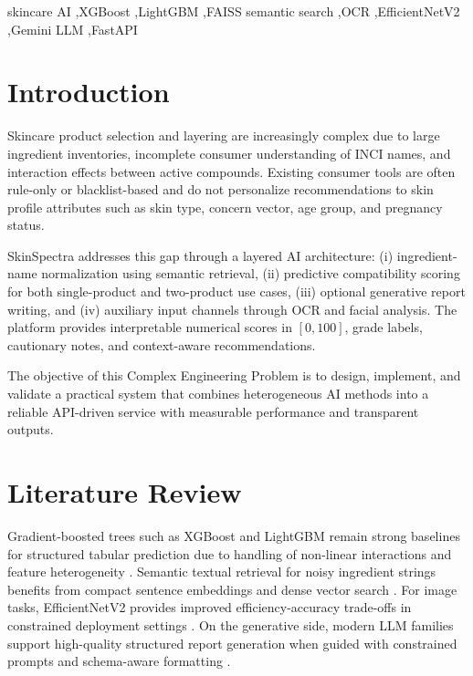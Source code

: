 \documentclass[a4paper,fleqn]{cas-sc}
\begin{document}
\begin{keywords}
 skincare AI \sep XGBoost \sep LightGBM \sep FAISS semantic search \sep OCR \sep EfficientNetV2 \sep Gemini LLM \sep FastAPI
\end{keywords}

\maketitle

\section{Introduction}\label{sec:intro}
Skincare product selection and layering are increasingly complex due to large ingredient inventories, incomplete consumer understanding of INCI names, and interaction effects between active compounds. Existing consumer tools are often rule-only or blacklist-based and do not personalize recommendations to skin profile attributes such as skin type, concern vector, age group, and pregnancy status.

SkinSpectra addresses this gap through a layered AI architecture: (i) ingredient-name normalization using semantic retrieval, (ii) predictive compatibility scoring for both single-product and two-product use cases, (iii) optional generative report writing, and (iv) auxiliary input channels through OCR and facial analysis. The platform provides interpretable numerical scores in $[0,100]$, grade labels, cautionary notes, and context-aware recommendations.

The objective of this Complex Engineering Problem is to design, implement, and validate a practical system that combines heterogeneous AI methods into a reliable API-driven service with measurable performance and transparent outputs.

\section{Literature Review}\label{sec:lit}
Gradient-boosted trees such as XGBoost and LightGBM remain strong baselines for structured tabular prediction due to handling of non-linear interactions and feature heterogeneity \citep{chen2016xgboost,ke2017lightgbm}. Semantic textual retrieval for noisy ingredient strings benefits from compact sentence embeddings and dense vector search \citep{reimers2019sentencebert,johnson2021faiss}. For image tasks, EfficientNetV2 provides improved efficiency-accuracy trade-offs in constrained deployment settings \citep{tan2021efficientnetv2}. On the generative side, modern LLM families support high-quality structured report generation when guided with constrained prompts and schema-aware formatting \citep{anil2023gemini,brown2020gpt3}.
\end{document}
